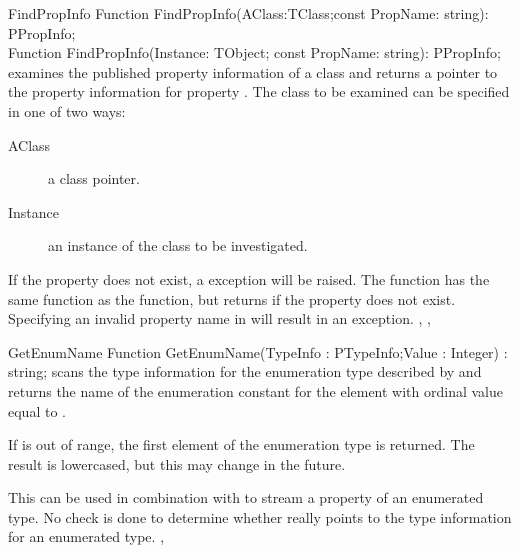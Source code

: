 \begin{function}{FindPropInfo}
\Declaration
Function FindPropInfo(AClass:TClass;const PropName: string): PPropInfo;\\
Function FindPropInfo(Instance: TObject; const PropName: string): PPropInfo;   
\Description
{} examines the published property information of a class and
returns a pointer to the property information for property .
The class to be examined can be specified in one of two ways:
\begin{description}
\item[AClass] a class pointer.
\item[Instance] an instance of the class to be investigated.
\end{description}
If the property does not exist, a  exception will be
raised. The  function has the same function as the
 function, but returns  if the property does not
exist.
\Errors
Specifying an invalid property name in  will result in an
 exception.
\SeeAlso
{}, , 
\end{function}


\begin{function}{GetEnumName}
\Declaration
Function GetEnumName(TypeInfo : PTypeInfo;Value : Integer) : string;
\Description
{} scans the type information for the enumeration type
described by  and returns the name of the enumeration 
constant for the element with ordinal value equal to .

If  is out of range, the first element of the enumeration type
is returned. The result is lowercased, but this may change in the future.

This can be used in combination with  to stream a property
of an enumerated type.
\Errors
No check is done to determine whether  really points to the 
type information for an enumerated type. 
\SeeAlso
{}, 
\end{function}


